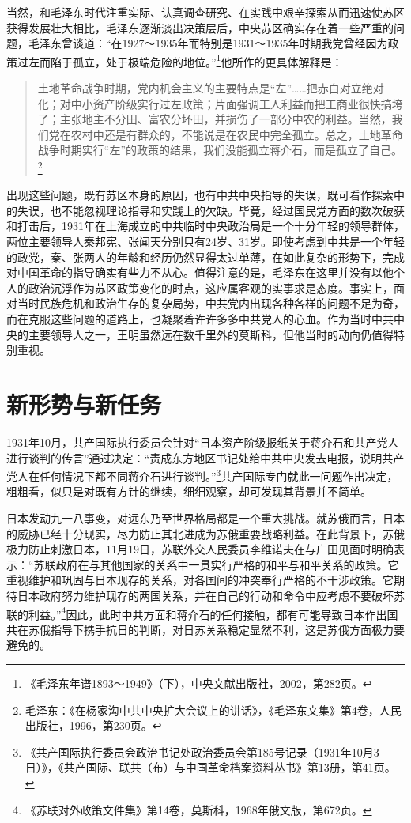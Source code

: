 当然，和毛泽东时代注重实际、认真调查研究、在实践中艰辛探索从而迅速使苏区获得发展壮大相比，毛泽东逐渐淡出决策层后，中央苏区确实存在着一些严重的问题，毛泽东曾谈道：“在1927～1935年而特别是1931～1935年时期我党曾经因为政策过左而陷于孤立，处于极端危险的地位。”\footnote{《毛泽东年谱1893～1949》（下），中央文献出版社，2002，第282页。}他所作的更具体解释是：

\begin{quote}

土地革命战争时期，党内机会主义的主要特点是“左”……把赤白对立绝对化；对中小资产阶级实行过左政策；片面强调工人利益而把工商业很快搞垮了；主张地主不分田、富农分坏田，并损伤了一部分中农的利益。当然，我们党在农村中还是有群众的，不能说是在农民中完全孤立。总之，土地革命战争时期实行“左”的政策的结果，我们没能孤立蒋介石，而是孤立了自己。\footnote{毛泽东：《在杨家沟中共中央扩大会议上的讲话》，《毛泽东文集》第4卷，人民出版社，1996，第230页。}
\end{quote}


出现这些问题，既有苏区本身的原因，也有中共中央指导的失误，既可看作探索中的失误，也不能忽视理论指导和实践上的欠缺。毕竟，经过国民党方面的数次破获和打击后，1931年在上海成立的中共临时中央政治局是一个十分年轻的领导群体，两位主要领导人秦邦宪、张闻天分别只有24岁、31岁。即使考虑到中共是一个年轻的政党，秦、张两人的年龄和经历仍然显得太过单薄，在如此复杂的形势下，完成对中国革命的指导确实有些力不从心。值得注意的是，毛泽东在这里并没有以他个人的政治沉浮作为苏区政策变化的时点，这应属客观的实事求是态度。事实上，面对当时民族危机和政治生存的复杂局势，中共党内出现各种各样的问题不足为奇，而在克服这些问题的道路上，也凝聚着许许多多中共党人的心血。作为当时中共中央的主要领导人之一，王明虽然远在数千里外的莫斯科，但他当时的动向仍值得特别重视。

\section{新形势与新任务}


1931年10月，共产国际执行委员会针对“日本资产阶级报纸关于蒋介石和共产党人进行谈判的传言”通过决定：“责成东方地区书记处给中共中央发去电报，说明共产党人在任何情况下都不同蒋介石进行谈判。”\footnote{《共产国际执行委员会政治书记处政治委员会第185号记录（1931年10月3日）》，《共产国际、联共（布）与中国革命档案资料丛书》第13册，第41页。}共产国际专门就此一问题作出决定，粗粗看，似只是对既有方针的继续，细细观察，却可发现其背景并不简单。


日本发动九一八事变，对远东乃至世界格局都是一个重大挑战。就苏俄而言，日本的威胁已经十分现实，尽力防止其北进成为苏俄重要战略利益。在此背景下，苏俄极力防止刺激日本，11月19日，苏联外交人民委员李维诺夫在与广田见面时明确表示：“苏联政府在与其他国家的关系中一贯实行严格的和平与和平关系的政策。它重视维护和巩固与日本现存的关系，对各国间的冲突奉行严格的不干涉政策。它期待日本政府努力维护现存的两国关系，并在自己的行动和命令中应考虑不要破坏苏联的利益。”\footnote{《苏联对外政策文件集》第14卷，莫斯科，1968年俄文版，第672页。}因此，此时中共方面和蒋介石的任何接触，都有可能导致日本作出国共在苏俄指导下携手抗日的判断，对日苏关系稳定显然不利，这是苏俄方面极力要避免的。


